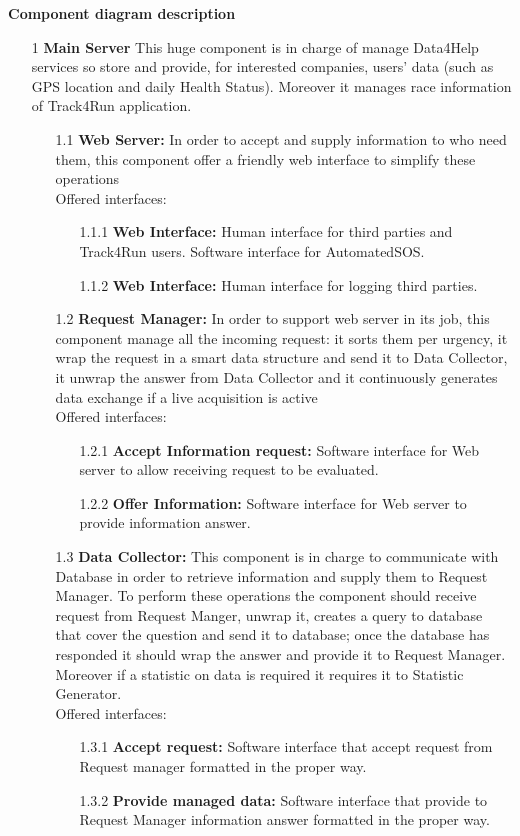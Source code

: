{\large \textbf{Component diagram description}}
\begin{enumerate}
\item [1] \textbf{Main Server} 
This huge component is in charge of manage Data4Help services so store and provide, for interested companies, users’ data (such as GPS location and daily Health Status). Moreover it manages race information of Track4Run application.

	\begin{enumerate}
	\item [1.1] \textbf{Web Server:} In order to accept and supply information to who need them, this component offer a friendly web interface to simplify these operations\\Offered interfaces:
		\begin{enumerate}
		\item [1.1.1] \textbf{Web Interface:} Human interface for third parties and Track4Run users. Software interface for AutomatedSOS.
		\item [1.1.2] \textbf{Web Interface:} Human interface for logging third parties.
		\end{enumerate}
		
	\item [1.2] \textbf{Request Manager:} In order to support web server in its job, this component manage all the incoming request: it sorts them per urgency, it wrap the request in a smart data structure and send it to Data Collector, it unwrap the answer from Data Collector and it continuously generates data exchange if a live acquisition is active\\Offered interfaces:
		\begin{enumerate}
		\item [1.2.1] \textbf{Accept Information request:} Software interface for Web server to allow receiving request to be evaluated.
		\item [1.2.2] \textbf{Offer Information:} Software interface for Web server to provide information answer.
		\end{enumerate}	
		
	\item [1.3] \textbf{Data Collector:} This component is in charge to communicate with Database in order to retrieve information and supply them to Request Manager. To perform these operations the component should receive request from Request Manger, unwrap it, creates a query to database that cover the question and send it to database; once the database has responded it should wrap the answer and provide it to Request Manager. Moreover if a statistic on data is required it requires it to Statistic Generator.\\Offered interfaces:
		\begin{enumerate}
		\item [1.3.1] \textbf{Accept request:} Software interface that accept request from Request manager formatted in the proper way.
		\item [1.3.2] \textbf{Provide managed data:} Software interface that provide to Request Manager information answer formatted in the proper way.
		\end{enumerate}	
		

\end{enumerate}
\end{enumerate}
